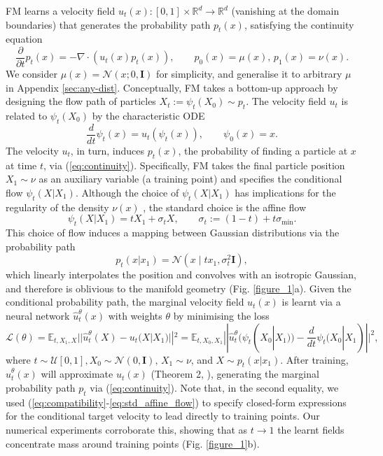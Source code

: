 \documentclass{article} %
\newcommand{\E}{\mathbb{E}}
\newcommand{\Ls}{\mathcal{L}}
\newcommand{\R}{\mathbb{R}}
\newcommand{\N}{\mathcal{N}}
\newcommand{\I}{\mathbf{I}}
\begin{document}
FM learns a velocity field $u_t(x):[0,1]\times \R^d \to \R^d$ (vanishing at the domain boundaries) that generates the probability path $p_t(x)$, satisfying the continuity equation
%
\begin{equation}\label{eq:continuity}
    \frac{\partial}{\partial t} p_t(x) = - \nabla \cdot (u_t(x)p_t(x)), \qquad p_0(x) = \mu(x),\,p_1(x) = \nu(x).
\end{equation}
%
We consider $\mu(x)=\N(x;0,\I)$ for simplicity, and generalise it to arbitrary $\mu$ in Appendix \ref{sec:any-dist}. 
%
Conceptually, FM takes a bottom-up approach by designing the flow path of particles $X_t:=\psi_t(X_0)\sim p_t$. 
The velocity field $u_t$ is related to $\psi_t(X_0)$ by the characteristic ODE
%
\begin{equation}\label{eq:compatibility}
    \frac{d}{dt}\psi_t(x)=u_t(\psi_t(x)),\qquad \psi_0(x)=x.
\end{equation}
%
The velocity $u_t$, in turn, induces $p_t(x)$, the probability of finding a particle at $x$ at time $t$, via (\ref{eq:continuity}). 
%
Specifically, FM takes the final particle position $X_1 \sim \nu$ as an auxiliary variable (a training point) and specifies the conditional flow $\psi_t(X|X_1)$. 
Although the choice of $\psi_t(X|X_1)$ has implications for the regularity of the density $\nu(x)$ \citep{albergo_stochastic_2023}, the standard choice is the affine flow
%
\begin{equation}\label{eq:std_affine_flow}
    \psi_t(X|X_1) = tX_1 +  \sigma_tX,\qquad \sigma_t:=(1-t) +t\sigma_{\min}.
\end{equation}
%
This choice of flow induces a mapping between Gaussian distributions via the probability path
%
\begin{equation}\label{eq:ot_path}
   p_t(x|x_1) = \mathcal N\left(x\mid tx_1, \sigma_t^2\I\right),
\end{equation}
%
which linearly interpolates the position and convolves with an isotropic Gaussian, and therefore is oblivious to the manifold geometry (Fig. \ref{figure_1}a).
%
Given the conditional probability path, the marginal velocity field $u_t(x)$ is learnt via a neural network $\hat{u}^\theta_t(x)$ with weights $\theta$ by minimising the loss
%
\begin{equation}\label{eq:fm_loss}
    \Ls(\theta) = \E_{t,X_1, X}|| \hat{u}^\theta_t(X) - u_t(X|X_1) ||^2 = \E_{t,X_0,X_1}|| \hat{u}^\theta_t(\psi_t(X_0|X_1)) - \frac{d}{dt}\psi_t(X_0|X_1) ||^2,
\end{equation}
%
where $t\sim \mathcal{U}[0,1],X_0\sim \N(0,\I),\,X_1\sim \nu$, and $X\sim p_t(x|x_1)$. 
After training, $\hat{u}^\theta_t(x)$ will approximate $u_t(x)$ (Theorem 2, \cite{lipman2023flow}), generating the marginal probability path $p_t$ via (\ref{eq:continuity}).
Note that, in the second equality, we used (\ref{eq:compatibility}-\ref{eq:std_affine_flow}) to specify closed-form expressions for the conditional target velocity to lead directly to training points.
Our numerical experiments corroborate this, showing that as $t\to 1$ the learnt fields concentrate mass around training points (Fig. \ref{figure_1}b).
\end{document}

